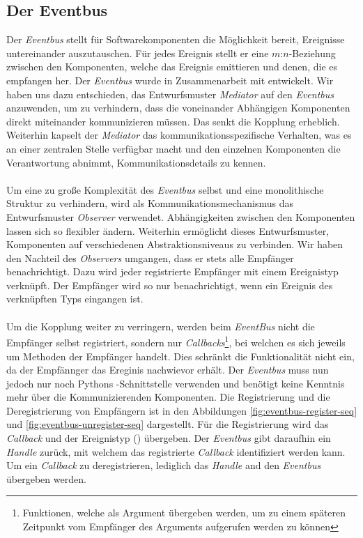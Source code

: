 \subsection{Der Eventbus}

Der \emph{Eventbus} stellt für Softwarekomponenten die Möglichkeit bereit, Ereignisse untereinander auszutauschen. Für jedes Ereignis stellt er eine $m$:$n$-Beziehung zwischen den Komponenten, welche das Ereignis emittieren und denen, die es empfangen her. Der \emph{Eventbus} wurde in Zusammenarbeit mit \citeauthor{persitzky_fehlerinjektion_2023} entwickelt. Wir haben uns dazu entschieden, das Entwurfsmuster \emph{Mediator} auf den \emph{Eventbus} anzuwenden, um zu verhindern, dass die voneinander Abhängigen Komponenten direkt miteinander kommunizieren müssen. Das senkt die Kopplung erheblich. Weiterhin kapselt der \emph{Mediator} das kommunikationsspezifische Verhalten, was es an einer zentralen Stelle verfügbar macht und den einzelnen Komponenten die Verantwortung abnimmt, Kommunikationsdetails zu kennen.\\
\\
Um eine zu große Komplexität des \emph{Eventbus} selbst und eine monolithische Struktur zu verhindern, wird als Kommunikationsmechanismus das Entwurfsmuster \emph{Observer} verwendet. Abhängigkeiten zwischen den Komponenten lassen sich so flexibler ändern. Weiterhin ermöglicht dieses Entwurfsmuster, Komponenten auf verschiedenen Abstraktionsniveaus zu verbinden. Wir haben den Nachteil des \emph{Observers} umgangen, dass er stets alle Empfänger benachrichtigt. Dazu wird jeder registrierte Empfänger mit einem Ereignistyp verknüpft. Der Empfänger wird so nur benachrichtigt, wenn ein Ereignis des verknüpften Typs eingangen ist.\\
\\
Um die Kopplung weiter zu verringern, werden beim \emph{EventBus} nicht die Empfänger selbst registriert, sondern nur \emph{Callbacks}\footnote{Funktionen, welche als Argument übergeben werden, um zu einem späteren Zeitpunkt vom Empfänger des Arguments aufgerufen werden zu können}, bei welchen es sich jeweils um Methoden der Empfänger handelt. Dies schränkt die Funktionalität nicht ein, da der Empfännger das Ereginis nachwievor erhält. Der \emph{Eventbus} muss nun jedoch nur noch Pythons -Schnittstelle verwenden und benötigt keine Kenntnis mehr über die Kommunizierenden Komponenten. Die Registrierung und die Deregistrierung von Empfängern ist in den Abbildungen \ref{fig:eventbus-register-seq} und \ref{fig:eventbus-unregister-seq} dargestellt. Für die Registrierung wird das \emph{Callback} und der Ereignistyp () übergeben. Der \emph{Eventbus} gibt daraufhin ein \emph{Handle} zurück, mit welchem das registrierte \emph{Callback} identifiziert werden kann. Um ein \emph{Callback} zu deregistrieren, lediglich das \emph{Handle} and den \emph{Eventbus} übergeben werden.

